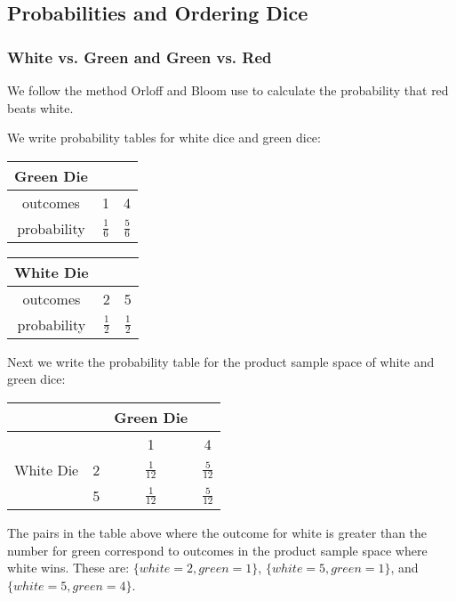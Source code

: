 \documentclass[a4paper,11pt]{article}
\begin{document}
\subsection{Probabilities and Ordering Dice}
\subsubsection{White vs. Green and Green vs. Red}
We follow the method Orloff and Bloom use to calculate the probability
that red beats white\cite{classSlides2}.

We write probability tables for white dice and green dice:

\begin{center}
  \begin{tabular}{ | c | c | c |}
    \hline
    Green Die & & \\ \hline
    outcomes & 1 & 4 \\ \hline
    probability & $\frac{1}{6}$ & $\frac{5}{6}$  \\ \hline
  \end{tabular}
\end{center}

\begin{center}
  \begin{tabular}{ | c | c | c |}
    \hline
    White Die & & \\ \hline
    outcomes & 2 & 5 \\ \hline
    probability & $\frac{1}{2}$ & $\frac{1}{2}$  \\ \hline
  \end{tabular}
\end{center}

Next we write the probability table for the product sample space of
white and green dice:

\begin{center}
  \begin{tabular}{ | c | c | c | c| }
    \hline
     & & Green Die & \\ \hline
    & & 1 & 4 \\ \hline
    White Die & 2 & $\frac{1}{12}$ & $\frac{5}{12}$\\ \hline
     & 5 & $\frac{1}{12}$ & $\frac{5}{12}$ \\ \hline
  \end{tabular}
\end{center}

The pairs in the table above where the outcome for white is greater
than the number for green correspond to outcomes in the product
sample space where white wins.  These are: $\{ white=2, green=1\}$,
$\{white=5, green=1\}$, and $\{white=5, green=4\}$.
\end{document}
